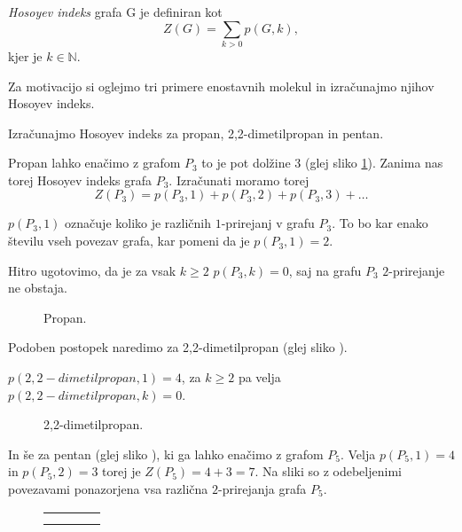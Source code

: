 \documentclass[mat1, tisk]{fmfdelo}
\def\N{\mathbb{N}} %
\begin{document}
\begin{definicija}
    \emph{Hosoyev indeks} grafa G je definiran kot
    $$
    Z(G) = \sum_{ k > 0} p(G,k),
    $$
    kjer je $k \in \N$.
\end{definicija}

Za motivacijo si oglejmo tri primere enostavnih
molekul in izračunajmo njihov Hosoyev indeks.

\begin{zgled}

  Izračunajmo Hosoyev indeks za propan, 2,2-dimetilpropan in pentan.

  Propan lahko enačimo z grafom $P_3$ to je pot dolžine 3 (glej sliko \ref{fig:propan}). 
  Zanima nas torej Hosoyev indeks grafa $P_3$.  
  Izračunati moramo torej 
  $$Z(P_3) = p(P_3,1) + p(P_3,2) + p(P_3,3) + \dots$$

  $p(P_3,1)$ označuje koliko je različnih $1$-prirejanj v grafu $P_3$.
  To bo kar enako številu vseh povezav grafa, kar pomeni da je
  $p(P_3,1) = 2$.

  Hitro ugotovimo, da je za vsak $k \geq 2$ 
  $p(P_3,k) = 0$, saj na grafu $P_3$ $2$-prirejanje ne obstaja.
  
  
  \begin{figure} [H]
    \begin{center}
  
      
      \label{fig:propan}
      \caption{Propan.}
    \end{center}
  \end{figure}


  Podoben postopek naredimo za 2,2-dimetilpropan (glej sliko \cite{fig:dimetilpropan}).
  
  $p(2,2-dimetilpropan, 1) = 4$, 
  za $k \geq 2$ pa velja
  $p(2,2-dimetilpropan, k) = 0$.
  \begin{figure} [H]
    \begin{center}
  
      
      \label{fig:dimetilpropan}
      \caption{2,2-dimetilpropan.}
    \end{center}
  \end{figure}


  In še za pentan (glej sliko \cite{fig:pentan}), ki ga lahko
  enačimo z grafom $P_5$. 
  Velja $p(P_5, 1) = 4$ in $p(P_5, 2) = 3$ torej je $Z(P_5) = 4 + 3 = 7$.
  Na sliki \cite{fig:pentan} so z odebeljenimi
  povezavami ponazorjena vsa različna $2$-prirejanja grafa $P_5$.


  \begin{figure} [H]
    \begin{center}
      \begin{tabular}{@{}cccc@{}}
        {} \\ 
        {} \\ 
        
      \end{tabular}


\end{center}
\end{figure}
\end{zgled}
\end{document}
